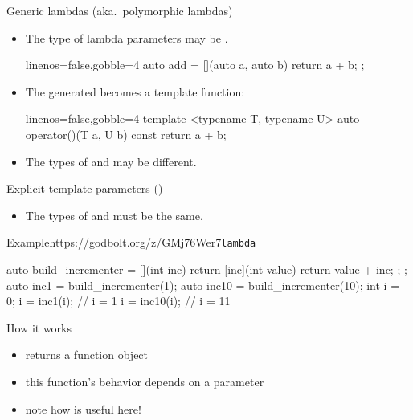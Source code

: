 \begin{advanced}
\begin{frame}[fragile]
  \begin{block}{Generic lambdas (aka.\ polymorphic lambdas)}
    \begin{itemize}
      \item The type of lambda parameters may be .
      \begin{cppcode*}{linenos=false,gobble=4}
        auto add = [](auto a, auto b) { return a + b; };
      \end{cppcode*}
      \item The generated  becomes a template function:
      \begin{cppcode*}{linenos=false,gobble=4}
        template <typename T, typename U>
        auto operator()(T a, U b) const { return a + b; }
      \end{cppcode*}
      \item The types of  and  may be different.
    \end{itemize}
  \end{block}
  \begin{block}{Explicit template parameters ()}
    \begin{itemize}
      \begin{cppcode*}{linenos=false,gobble=4}
        auto add = []<typename T>(T a, T b)
          { return a + b; };
      \end{cppcode*}
      \item The types of  and  must be the same.
    \end{itemize}
  \end{block}
\end{frame}

\begin{frame}[fragile]
  \begin{exampleblockGB}{Example}{https://godbolt.org/z/GMj76Wer7}{\texttt{lambda}}
    \begin{cppcode*}{}
      auto build_incrementer = [](int inc) {
        return [inc](int value) { return value + inc; };
      };
      auto inc1 = build_incrementer(1);
      auto inc10 = build_incrementer(10);
      int i = 0;
      i = inc1(i);   // i = 1
      i = inc10(i);  // i = 11
    \end{cppcode*}
  \end{exampleblockGB}
  \begin{block}{How it works}
    \begin{itemize}
      \item {} returns a function object
      \item this function's behavior depends on a parameter
      \item note how  is useful here!
    \end{itemize}
  \end{block}
\end{frame}


\end{advanced}
